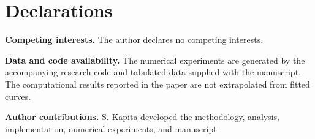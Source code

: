 \documentclass[pdflatex,sn-mathphys-num]{sn-jnl}
\theoremstyle{thmstyleone}
\theoremstyle{thmstyletwo}
\begin{document}
\section*{Declarations}
\textbf{Competing interests.} The author declares no competing interests.

\textbf{Data and code availability.} The numerical experiments are generated by the accompanying research code and tabulated data supplied with the manuscript.  The computational results reported in the paper are not extrapolated from fitted curves.

\textbf{Author contributions.} S. Kapita developed the methodology, analysis, implementation, numerical experiments, and manuscript.
\end{document}
